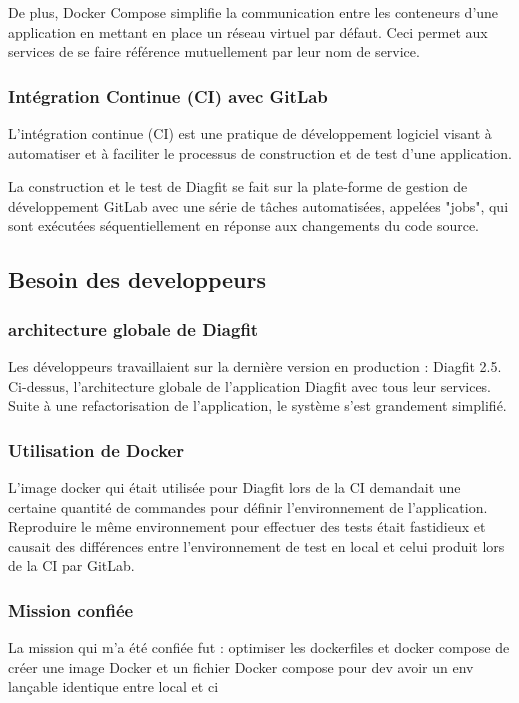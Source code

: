 De plus, Docker Compose simplifie la communication entre les conteneurs d'une application en mettant en place un réseau virtuel par défaut. Ceci permet aux services de se faire référence mutuellement par leur nom de service.

\subsubsection{Intégration Continue (CI) avec GitLab}
L'intégration continue (CI) est une pratique de développement logiciel visant à automatiser et à faciliter le processus de construction et de test d'une application.

La construction et le test de Diagfit se fait sur la plate-forme de gestion de développement GitLab avec une série de tâches automatisées, appelées "jobs", qui sont exécutées séquentiellement en réponse aux changements du code source.


\subsection{Besoin des developpeurs}
\subsubsection{architecture globale de Diagfit}
Les développeurs travaillaient sur la dernière version en production : Diagfit 2.5.
Ci-dessus, l'architecture globale de l'application Diagfit avec tous leur services.
Suite à une refactorisation de l'application, le système s'est grandement simplifié.

\subsubsection{Utilisation de Docker}
L'image docker qui était utilisée pour Diagfit lors de la CI demandait une certaine quantité de commandes pour définir l'environnement de l'application.
Reproduire le même environnement pour effectuer des tests était fastidieux et causait des différences entre l'environnement de test en local et celui produit lors de la CI par GitLab.

\subsubsection{Mission confiée}
La mission qui m'a été confiée fut :
optimiser les dockerfiles et docker compose
de créer une image Docker et un fichier Docker compose pour dev 
avoir un env lançable identique entre local et ci

